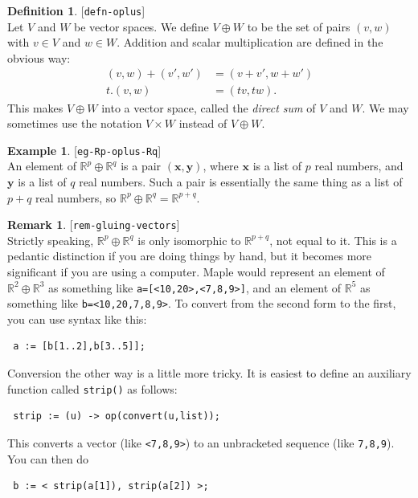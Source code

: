 \documentclass{amsart}
\newcommand{\lbl}[1]{\label{#1}\textup{[\texttt{#1}]}\ \\}
\newcommand{\lbl}{\label}
\newcommand{\R}         {{\mathbb{R}}}
\newcommand{\tm}        {\times}
\newcommand{\op}        {\oplus}
\newcommand{\vx}        {\mathbf{x}}
\newcommand{\vy}        {\mathbf{y}}
\renewcommand{\:}       {\colon}
\theoremstyle{definition}
\newtheorem{remark}[theorem]{Remark}
\newtheorem{definition}[theorem]{Definition}
\newtheorem{example}[theorem]{Example}
\begin{document}
\begin{definition}\lbl{defn-oplus}
 Let $V$ and $W$ be vector spaces.  We define $V\op W$ to
 be the set of pairs $(v,w)$ with $v\in V$ and $w\in W$.
 Addition and scalar multiplication are defined in the
 obvious way:
 \begin{align*}
  (v,w) + (v',w') &= (v+v',w+w') \\
  t.(v,w) &= (tv,tw).
 \end{align*}
 This makes $V\op W$ into a vector space, called the
 \emph{direct sum} of $V$ and $W$.  We may sometimes use the
 notation $V\tm W$ instead of $V\op W$.
\end{definition}
\begin{example}\lbl{eg-Rp-oplus-Rq}
 An element of $\R^p\op\R^q$ is a pair $(\vx,\vy)$, where
 $\vx$ is a list of $p$ real numbers, and $\vy$ is a list of
 $q$ real numbers.  Such a pair is essentially the same
 thing as a list of $p+q$ real numbers, so
 $\R^p\op\R^q=\R^{p+q}$. 
\end{example}
\begin{remark}\lbl{rem-gluing-vectors}
 Strictly speaking, $\R^p\op\R^q$ is only isomorphic to
 $\R^{p+q}$, not equal to it.  This is a pedantic
 distinction if you are doing things by hand, but it becomes
 more significant if you are using a computer.  Maple would
 represent an element of $\R^2\op\R^3$ as something like
 \verb+a=[<10,20>,<7,8,9>]+, and an element of $\R^5$ as
 something like \verb+b=<10,20,7,8,9>+.  To convert from the
 second form to the first, you can use syntax like this:
\begin{verbatim}
 a := [b[1..2],b[3..5]];
\end{verbatim}
 Conversion the other way is a little more tricky.  It is
 easiest to define an auxiliary function called
 \verb+strip()+ as follows:
\begin{verbatim}
 strip := (u) -> op(convert(u,list));
\end{verbatim}
 This converts a vector (like \verb+<7,8,9>+) to an
 unbracketed sequence (like \verb+7,8,9+).  You can then do 
\begin{verbatim}
 b := < strip(a[1]), strip(a[2]) >;
\end{verbatim}
\end{remark}
\end{document}
